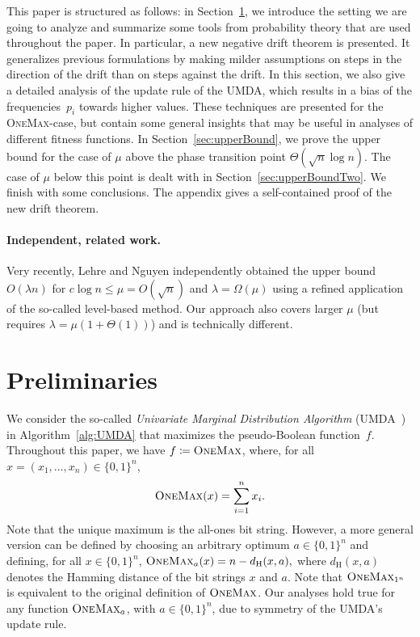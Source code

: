 \documentclass[11pt, a4paper]{article}
\newcommand*{\om}{\textsc{OneMax}\xspace}
\newcommand{\umda}{UMDA\xspace}
\begin{document}
This paper is structured as follows: in Section~\ref{sec:prelims}, we introduce the setting 
we are going to analyze and summarize some tools from probability theory that are used 
throughout the paper. In particular, a new negative drift theorem is presented. It generalizes 
previous formulations by making  
milder assumptions on steps in the direction of the drift than on steps against the drift. 
 In this section, we also give a detailed analysis of the update rule of the \umda, which results 
in a bias of the frequencies~$p_i$ towards higher values. These techniques are presented 
for the \om-case, but contain some general insights that may be useful in analyses of 
different fitness functions. 
In Section~\ref{sec:upperBound}, we prove the upper bound for the 
case of $\mu$ above the phase transition point $\Theta(\sqrt{n}\log n)$. The 
case of $\mu$ below this point is dealt with in Section~\ref{sec:upperBoundTwo}. 
We finish with some conclusions. The appendix gives a self-contained proof 
of the new drift theorem.


\paragraph{Independent, related work.} Very recently, Lehre and Nguyen \cite{LehreNguyenGECCO17} 
independently obtained the upper bound $O(\lambda n)$ for $c\log n\le \mu = O(\sqrt{n})$ and 
$\lambda=\Omega(\mu)$ using a 
refined application of the so-called level-based method. Our approach also covers larger $\mu$ (but requires 
$\lambda = \mu(1+\Theta(1))$) and is 
technically different.



\section{Preliminaries}
\label{sec:prelims}

\begin{sloppypar}We consider the so-called \emph{Univariate Marginal Distribution Algorithm} (\umda~\cite{MuhlenbeinPaass1996}) 
in Algorithm~\ref{alg:UMDA} that maximizes the pseudo-Boolean function~$f$. Throughout this paper, we have 
$f\coloneqq \om$, where, for all $x=(x_1,\dots,x_n) \in \{0, 1\}^n$,
\[
\om(x) = \sum_{i = 1}^{n} x_i.
\]
Note that the unique maximum is the all-ones bit string. However, a more general version can 
be defined by choosing an arbitrary optimum $a \in \{0, 1\}^n$ and defining, for all $x \in \{0, 1\}^n$,
$
    \om_a(x) = { n - d_{\mathrm{H}}(x, a)},
$
where $d_{\mathrm{H}}(x, a)$ denotes the Hamming distance of the bit strings $x$ and $a$. 
Note that $\om_{1^n}$ is equivalent to the original definition of $\om$. Our analyses hold true 
for any function $\om_a$, with $a \in \{0, 1\}^n$, due to symmetry of the \umda's update rule.\end{sloppypar}
\end{document}
